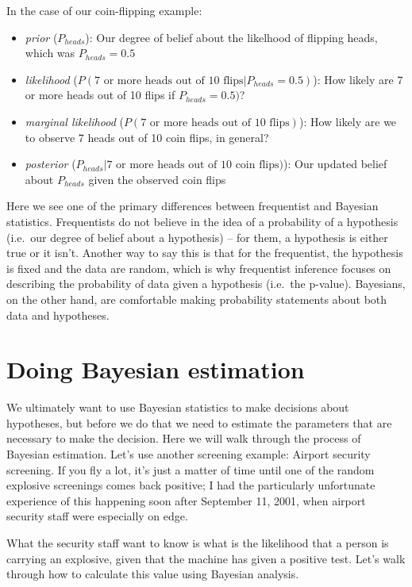 \documentclass[12pt,]{book}
\providecommand{\tightlist}{%
  \setlength{\itemsep}{0pt}\setlength{\parskip}{0pt}}
\theoremstyle{definition}
\theoremstyle{definition}
\theoremstyle{definition}
\theoremstyle{remark}
\begin{document}
In the case of our coin-flipping example:

\begin{itemize}
\tightlist
\item
  \emph{prior} (\(P_{heads}\)): Our degree of belief about the likelhood of flipping heads, which was \(P_{heads}=0.5\)
\item
  \emph{likelihood} (\(P(\text{7 or more heads out of 10 flips}|P_{heads}=0.5)\)): How likely are 7 or more heads out of 10 flips if \(P_{heads}=0.5)\)?
\item
  \emph{marginal likelihood} (\(P(\text{7 or more heads out of 10 flips})\)): How likely are we to observe 7 heads out of 10 coin flips, in general?
\item
  \emph{posterior} (\(P_{heads}|\text{7 or more heads out of 10 coin flips})\)): Our updated belief about \(P_{heads}\) given the observed coin flips
\end{itemize}

Here we see one of the primary differences between frequentist and Bayesian statistics. Frequentists do not believe in the idea of a probability of a hypothesis (i.e.~our degree of belief about a hypothesis) -- for them, a hypothesis is either true or it isn't. Another way to say this is that for the frequentist, the hypothesis is fixed and the data are random, which is why frequentist inference focuses on describing the probability of data given a hypothesis (i.e.~the p-value). Bayesians, on the other hand, are comfortable making probability statements about both data and hypotheses.

\hypertarget{doing-bayesian-estimation}{%
\section{Doing Bayesian estimation}\label{doing-bayesian-estimation}}

We ultimately want to use Bayesian statistics to make decisions about hypotheses, but before we do that we need to estimate the parameters that are necessary to make the decision. Here we will walk through the process of Bayesian estimation. Let's use another screening example: Airport security screening. If you fly a lot, it's just a matter of time until one of the random explosive screenings comes back positive; I had the particularly unfortunate experience of this happening soon after September 11, 2001, when airport security staff were especially on edge.

What the security staff want to know is what is the likelihood that a person is carrying an explosive, given that the machine has given a positive test. Let's walk through how to calculate this value using Bayesian analysis.
\end{document}
